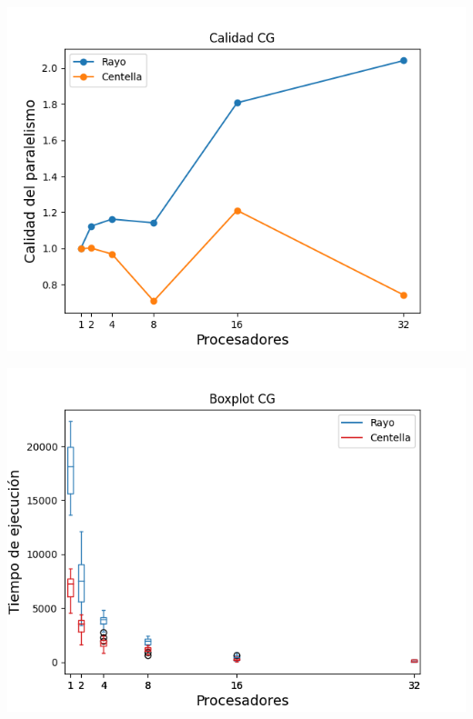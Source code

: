 \begin{center}
 \centering
 \begin{minipage}[b]{.49\textwidth}
  \includegraphics[width=1\linewidth]{plots/calidad-cg.png}
    \label{cg:calidad}
 \end{minipage}
 \begin{minipage}[b]{.49\textwidth}
  \includegraphics[width=1\linewidth]{plots/boxplot-cg.png}
    \label{cg:tiempo}
 \end{minipage}
\end{center}

\newpage


